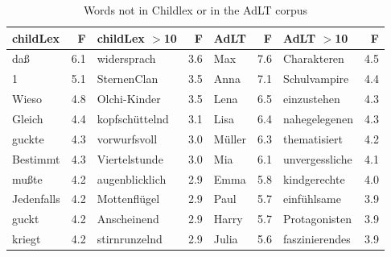 \documentclass[doc, a4paper, anonymous]{apa7}
\begin{document}
\begin{table}[!htbp]
\caption{Words not in Childlex or in the AdLT corpus}
\centering
\begin{tabular}{lrlrlrlr}
  \hline
childLex & F & childLex $>$10 & F & AdLT & F & AdLT $>$10 & F \\ 
  \hline
daß & 6.1 & widersprach & 3.6 & Max & 7.6 & Charakteren & 4.5 \\ 
  1 & 5.1 & SternenClan & 3.5 & Anna & 7.1 & Schulvampire & 4.4 \\ 
  Wieso & 4.8 & Olchi-Kinder & 3.5 & Lena & 6.5 & einzustehen & 4.3 \\ 
  Gleich & 4.4 & kopfschüttelnd & 3.1 & Lisa & 6.4 & nahegelegenen & 4.3 \\ 
  guckte & 4.3 & vorwurfsvoll & 3.0 & Müller & 6.3 & thematisiert & 4.2 \\ 
  Bestimmt & 4.3 & Viertelstunde & 3.0 & Mia & 6.1 & unvergessliche & 4.1 \\ 
  mußte & 4.2 & augenblicklich & 2.9 & Emma & 5.8 & kindgerechte & 4.0 \\ 
  Jedenfalls & 4.2 & Mottenflügel & 2.9 & Paul & 5.7 & einfühlsame & 3.9 \\ 
  guckt & 4.2 & Anscheinend & 2.9 & Harry & 5.7 & Protagonisten & 3.9 \\ 
  kriegt & 4.2 & stirnrunzelnd & 2.9 & Julia & 5.6 & faszinierendes & 3.9 \\ 
   \hline
\end{tabular}
\label{words-adlt}
\end{table}
\end{document}
